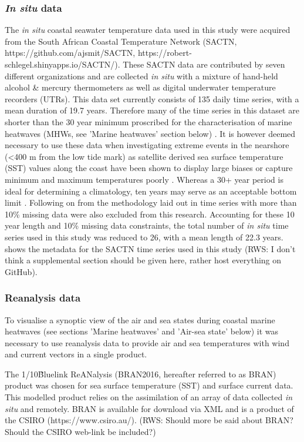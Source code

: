 \documentclass[a4paper,10pt,review]{elsarticle}
\begin{document}
\subsubsection{\emph{In situ} data}
The \emph{in situ} coastal seawater temperature data used in this study were acquired from the South African Coastal Temperature Network (SACTN, https://github.com/ajsmit/SACTN, https://robert-schlegel.shinyapps.io/SACTN/). These SACTN data are contributed by seven different organizations and are collected \emph{in situ} with a mixture of hand-held alcohol \& mercury thermometers as well as digital underwater temperature recorders (UTRs). This data set currently consists of 135 daily time series, with a mean duration of 19.7 years. Therefore many of the time series in this dataset are shorter than the 30 year minimum proscribed for the characterisation of marine heatwaves (MHWs, see 'Marine heatwaves' section below) \citep{Hobday2016}. It is however deemed necessary to use these data when investigating extreme events in the nearshore (<400 m from the low tide mark) as satellite derived sea surface temperature (SST) values along the coast have been shown to display large biases \citep{Smit2013} or capture minimum and maximum temperatures poorly \citep{Smale2009, Castillo2010}. Whereas a 30+ year period is ideal for determining a climatology, ten years may serve as an acceptable bottom limit \citep{Schlegel2017}. Following on from the methodology laid out in \citet{Schlegel2017} time series with more than 10\% missing data were also excluded from this research. Accounting for these 10 year length and 10\% missing data constraints, the total number of \emph{in situ} time series used in this study was reduced to 26, with a mean length of 22.3 years.  shows the metadata for the SACTN time series used in this study (RWS: I don't think a supplemental section should be given here, rather host everything on GitHub).

\subsubsection{Reanalysis data}
To visualise a synoptic view of the air and sea states during coastal marine heatwaves (see sections 'Marine heatwaves' and 'Air-sea state' below) it was necessary to use reanalysis data to provide air and sea temperatures with wind and current vectors in a single product.

The 1/10\degree\~ Bluelink ReANalysis (BRAN2016, hereafter referred to as BRAN) product was chosen for sea surface temperature (SST) and surface current data. This modelled product relies on the assimilation of an array of data collected \emph{in situ} and remotely. BRAN is available for download via XML and is a product of the CSIRO (https://www.csiro.au/). (RWS: Should more be said about BRAN? Should the CSIRO web-link be included?)
\end{document}
